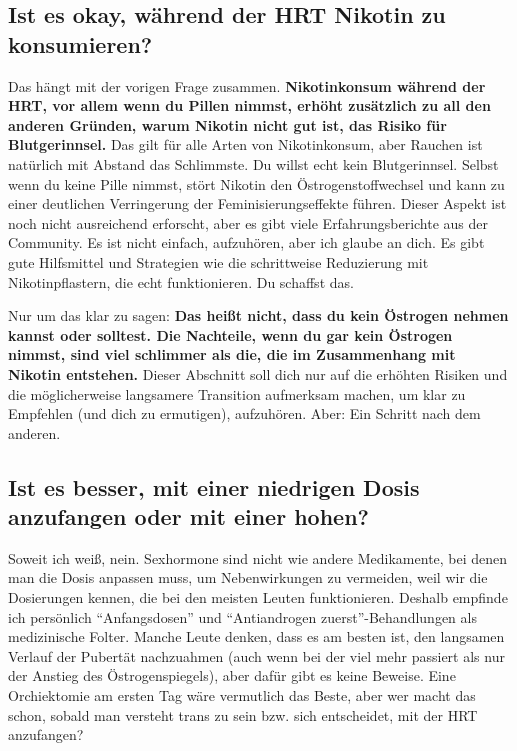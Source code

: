 \documentclass{article}
\begin{document}
\subsection{Ist es okay, während der HRT Nikotin zu konsumieren?}\label{11-2}

Das hängt mit der vorigen Frage zusammen. \textbf{Nikotinkonsum während der HRT, vor allem wenn du Pillen nimmst, erhöht zusätzlich zu all den anderen Gründen, warum Nikotin nicht gut ist, das Risiko für Blutgerinnsel.} Das gilt für alle Arten von Nikotinkonsum, aber Rauchen ist natürlich mit Abstand das Schlimmste. Du willst echt kein Blutgerinnsel. Selbst wenn du keine Pille nimmst, stört Nikotin den Östrogenstoffwechsel und kann zu einer deutlichen Verringerung der Feminisierungseffekte führen. Dieser Aspekt ist noch nicht ausreichend erforscht, aber es gibt viele Erfahrungsberichte aus der Community. Es ist nicht einfach, aufzuhören, aber ich glaube an dich. Es gibt gute Hilfsmittel und Strategien wie die schrittweise Reduzierung mit Nikotinpflastern, die echt funktionieren. Du schaffst das.

Nur um das klar zu sagen: \textbf{Das heißt nicht, dass du kein Östrogen nehmen kannst oder solltest. Die Nachteile, wenn du gar kein Östrogen nimmst, sind viel schlimmer als die, die im Zusammenhang mit Nikotin entstehen.} Dieser Abschnitt soll dich nur auf die erhöhten Risiken und die möglicherweise langsamere Transition aufmerksam machen, um klar zu Empfehlen (und dich zu ermutigen), aufzuhören. Aber: Ein Schritt nach dem anderen.

\subsection{Ist es besser, mit einer niedrigen Dosis anzufangen oder mit einer hohen?}

Soweit ich weiß, nein. Sexhormone sind nicht wie andere Medikamente, bei denen man die Dosis anpassen muss, um Nebenwirkungen zu vermeiden, weil wir die Dosierungen kennen, die bei den meisten Leuten funktionieren. Deshalb empfinde ich persönlich “Anfangsdosen” und “Antiandrogen zuerst”-Behandlungen als medizinische Folter. Manche Leute denken, dass es am besten ist, den langsamen Verlauf der Pubertät nachzuahmen (auch wenn bei der viel mehr passiert als nur der Anstieg des Östrogenspiegels), aber dafür gibt es keine Beweise. Eine Orchiektomie am ersten Tag wäre vermutlich das Beste, aber wer macht das schon, sobald man versteht trans zu sein bzw. sich entscheidet, mit der HRT anzufangen?
\end{document}
